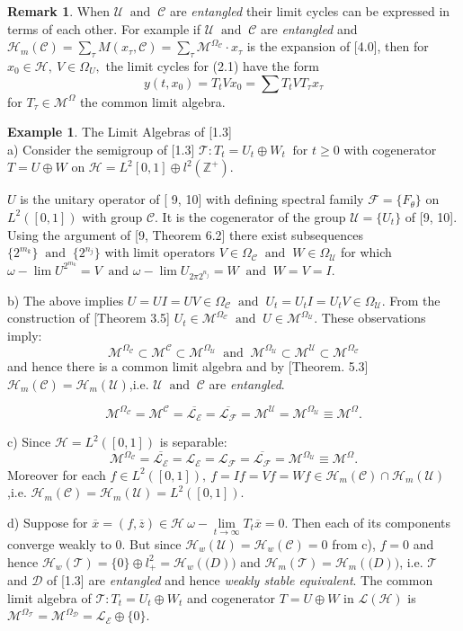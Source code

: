 \documentclass[req no]{amsart}[16pt]
\theoremstyle{plain}
\theoremstyle{definition}
\newtheorem{example}[theorem]{Example}
\newtheorem{remark}[theorem]{Remark}
\numberwithin{equation}{section}\setcounter{page}{1}
\def\m{\mbox}
\def\D{\displaystyle}
\def\ma{\m{ and }}
\def\mf{\m{ for }}
\def\o{\omega}
\def\O{\Omega}
\def\D{\mathcal{D}}
\def\h{\mathcal{H}}
\def\T {\mathcal{T}}
\def\E {\mathcal{E}}
\def\L {\mathcal{L}}
\def\M {\mathcal{M}}
\def\F {\mathcal{F}}
\def\C{\mathcal{C}}
\def\U{\mathcal{U}}
\begin{document}
\begin{remark}
  When $\U ~ \ma ~\C$ are \emph{entangled} their limit cycles can be expressed in terms of each other. For example if $\U ~ \ma ~\C$ are \emph{entangled} and $\h_{m}(\C) = \sum_\tau M(x_{\tau}, \C) = \sum_\tau \M^{\Omega_{\C}} \cdot x_{\tau}$ is the expansion of [4.0], then for $x_{0} \in \h,~ V \in \O_{U},$ the limit cycles for (2.1) have the form $$y(t,x_{0}) = T_{t}V x_{0}=\sum T_{t} V T_{\tau} x_{\tau} $$
  for $T_{\tau} \in \M^{\O}$ the common limit algebra.
\end{remark}
\begin{example}
The Limit Algebras of [1.3]\\
a) Consider the semigroup of [1.3] $\T: T_{t} = U_{t} \oplus W_{t}~\mf t\geq 0$ with cogenerator $T = U \oplus W$ on  $\h = L^{2}[0, 1] \oplus  l^{2}(\mathbb{Z}^{+})$.

$ U$ is the unitary operator of [ 9, 10] with defining spectral family $ \F = \{F_\theta\}$  on $L^{2}([0,1])$ with group $\C$. It is the cogenerator of the group $\U =\{U_{t}\}$ of [9, 10]. Using the argument of [9, Theorem 6.2] there exist subsequences $\{2^{m_{k}}\} ~\ma ~\{2^{n_{j}}\}$ with limit operators $V \in \Omega_{\C} ~ \ma ~ W \in \Omega_{\U} $ for which $\o-\lim U^{2^{m_{k}}} = V ~\ma\o-\lim U_{ 2 \pi 2^{n_{j}}} = W~ \ma ~ W=V=I.$

b) The above implies $U = UI = UV \in \Omega_{\C}~\ma~ U_{t} = U_{t}I = U_{t}V \in \Omega_{\U} $. From the construction of [Theorem 3.5] $U_{t} \in \M^{\Omega_{\C}} ~ \ma ~ U \in \M^{\Omega_{\U}}$. These observations imply:
$$\M^{\Omega_{\C}} \subset \M^{\C} \subset \M^{\Omega_{\U}} ~\ma~ \M^{\Omega_{\U}} \subset \M^{\U} \subset \M^{\Omega_{\C}}$$
and hence there is a common limit algebra and by [Theorem. 5.3] $\h_{m}(\C) = \h_{m}(\U)$,i.e. $\U~\ma~\C$ are \emph{entangled}.

$$\mathcal{M}^{\Omega_\C}= \mathcal{M}^{\C}=\overline{\L_{\E}}= \overline{\L_{\F}}=\M^\mathcal{U}=\mathcal{M}^{\Omega_\U}\equiv\M^{\Omega}.$$

c) Since $\h = L^{2}([0,1])$ is separable: $$\mathcal{M}^{\Omega_\C}= \overline{\L_{\E}}= \L_{\E}= \L_{\F}= \overline{\L_{\F}}=\mathcal{M}^{\Omega_\U}\equiv\M^{\Omega}.$$
Moreover for each $f \in L^{2}([0,1]), ~ f = If = Vf =Wf \in \h_{m}(\C)\cap\h_{m}(\U)$,i.e. $\h_{m}(\C)= \h_{m}(\U) = L^{2}([0,1])$.

d) Suppose for $\overline{x} = (f, \overline{z}) \in \h ~ \o- \lim\limits_{t\to\infty} T_{t}\overline{x}=0$. Then each of its components converge weakly to 0. But since $\h_{w}(\U) = \h_{w}(\C) = 0$ from c), $f = 0$ and hence $\h_{w}(\T) = \{0\}\oplus l^{2}_{+} = \h_{w}(\mathcal(D))$ and $\h_{m}(\T) = \h_{m}(\mathcal(D))$, i.e. $\T$ and $\mathcal{D}$ of [1.3] are \emph{entangled} and hence \emph{weakly stable equivalent}. The common limit algebra of $\T: T_{t} = U_{t} \oplus W_{t}$ and cogenerator $T = U \oplus W$ in $\L(\h)$ is  $\M^{\Omega_{\T}}=\M^{\Omega_{\D}}= \L_{\E}\oplus \{0\}$.
\end{example}
\end{document}
